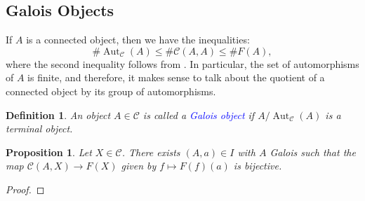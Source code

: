 \documentclass[10pt]{article}
\theoremstyle{thmstyle}
\newtheorem{proposition}[theorem]{Proposition}
\theoremstyle{defstyle}
\newtheorem{definition}[theorem]{Definition}
\newcommand{\Aut}{\operatorname{Aut}}
\newcommand{\scrC}{\mathscr{C}} %
\newcommand{\define}[1]{\textcolor{blue}{\textit{#1}}}
\renewcommand{\le}{\leqslant}
\begin{document}
\subsection{Galois Objects}

If $A$ is a connected object, then we have the inequalities: 
\begin{equation*}
    \#\Aut_{\scrC}(A)\le\#\scrC(A, A)\le\# F(A),
\end{equation*}
where the second inequality follows from . In particular, the set of automorphisms of $A$ is finite, and therefore, it makes sense to talk about the quotient of a connected object by its group of automorphisms.

\begin{definition}
    An object $A\in\scrC$ is called a \define{Galois object} if $A/\Aut_{\scrC}(A)$ is a terminal object.
\end{definition}


\begin{proposition}
    Let $X\in\scrC$. There exists $(A, a)\in I$ with $A$ Galois such that the map $\scrC(A, X)\to F(X)$ given by $f\mapsto F(f)(a)$ is bijective.
\end{proposition}
\begin{proof}
    
\end{proof}
\end{document}

